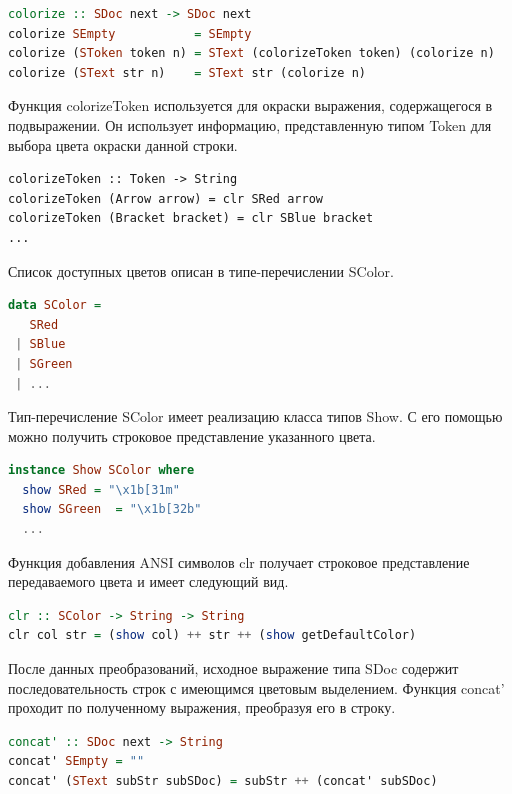 \begin{lstlisting}[language=Haskell, caption=Окрашивание выражения]
colorize :: SDoc next -> SDoc next
colorize SEmpty           = SEmpty
colorize (SToken token n) = SText (colorizeToken token) (colorize n)
colorize (SText str n)    = SText str (colorize n)
\end{lstlisting}

Функция colorizeToken используется для окраски выражения, содержащегося в подвыражении. Он использует информацию, представленную типом Token для выбора цвета окраски данной строки.

\begin{lstlisting}
colorizeToken :: Token -> String
colorizeToken (Arrow arrow) = clr SRed arrow
colorizeToken (Bracket bracket) = clr SBlue bracket
...
\end{lstlisting}

Список доступных цветов описан в типе-перечислении SColor.

\begin{lstlisting}[language=Haskell]
data SColor = 
   SRed
 | SBlue
 | SGreen
 | ...
\end{lstlisting}

Тип-перечисление SColor имеет реализацию класса типов Show. С его помощью можно получить строковое представление указанного цвета.

\begin{lstlisting}[language=Haskell]
instance Show SColor where
  show SRed = "\x1b[31m"
  show SGreen  = "\x1b[32b"
  ...
\end{lstlisting}

Функция добавления ANSI символов clr получает строковое представление передаваемого цвета и имеет следующий вид.

\begin{lstlisting}[language=Haskell]
clr :: SColor -> String -> String
clr col str = (show col) ++ str ++ (show getDefaultColor)
\end{lstlisting}

После данных преобразований, исходное выражение типа SDoc содержит последовательность строк с имеющимся цветовым выделением. Функция concat' проходит по полученному выражения, преобразуя его в строку.

\begin{lstlisting}[language=Haskell]
concat' :: SDoc next -> String
concat' SEmpty = ""
concat' (SText subStr subSDoc) = subStr ++ (concat' subSDoc)
\end{lstlisting}

